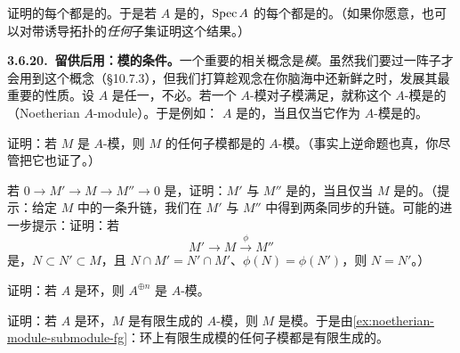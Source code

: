 \begin{exercise}[练习~3.6.G(b) 所许诺的]\label{ex:noetherian-open-quasicompact}
证明\trNoetherian{}\trTopologicalSpace{}的每个\trOpenSubset{}都是\trQuasicompact{}的。于是若 $A$ 是\trNoetherian{}的，$\operatorname{Spec} A$ 的每个\trOpenSubset{}都是\trQuasicompact{}的。（如果你愿意，也可以对带诱导拓扑的\emph{任何}子集证明这个结果。）
\end{exercise}

\textbf{3.6.20.\ 留供后用：模的\trNoetherian{}条件。}\quad 一个重要的相关概念是\trNoetherian{}\emph{模}。虽然我们要过一阵子才会用到这个概念（\S10.7.3），但我们打算趁\trNoetherian{}观念在你脑海中还新鲜之时，发展其最重要的性质。设 $A$ 是任一\trRing，不必\trNoetherian。若一个 $A$-模对子模满足\trAscendingChainCondition{}，就称这个 $A$-模是\textbf{\trNoetherian}的（Noetherian $A$-module）。于是例如：\trRing{} $A$ 是\trNoetherian{}的，当且仅当它作为 $A$-模是\trNoetherian{}的。

\begin{exercise}\label{ex:noetherian-module-submodule-fg}
证明：若 $M$ 是\trNoetherian{} $A$-模，则 $M$ 的任何子模都是\trFinitelyGenerated{}的 $A$-模。（事实上逆命题也真，你尽管把它也证了。）
\end{exercise}

\begin{exercise}\label{ex:noetherian-module-extension}
若 $0\to M'\to M\to M''\to 0$ 是\trExactSequence，证明：$M'$ 与 $M''$ 是\trNoetherian{}的，当且仅当 $M$ 是\trNoetherian{}的。（提示：给定 $M$ 中的一条升链，我们在 $M'$ 与 $M''$ 中得到两条同步的升链。可能的进一步提示：证明：若
\[
M'\longrightarrow M\xrightarrow{\ \phi\ }M''
\]
是\trExactSequence，$N\subset N'\subset M$，且 $N\cap M'=N'\cap M'$、$\phi(N)=\phi(N')$，则 $N=N'$。）
\end{exercise}

\begin{exercise}\label{ex:noetherian-free-module}
证明：若 $A$ 是\trNoetherian{}环，则 $A^{\oplus n}$ 是\trNoetherian{} $A$-模。
\end{exercise}

\begin{exercise}\label{ex:finitely-generated-noetherian-module}
证明：若 $A$ 是\trNoetherian{}环，$M$ 是有限生成的 $A$-模，则 $M$ 是\trNoetherian{}模。于是由\cref{ex:noetherian-module-submodule-fg}：\trNoetherian{}环上有限生成模的任何子模都是有限生成的。
\end{exercise}

